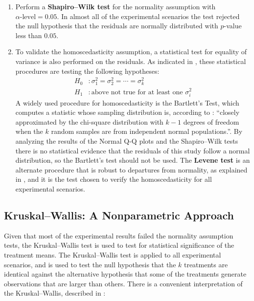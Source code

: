 \begin{enumerate}
    \item Perform a {\large\textbf{Shapiro–Wilk test}} for the normality assumption with $\alpha\text{-level} = 0.05$. In almost all of the experimental scenarios the test rejected the null hypothesis that the residuals are normally distributed with $p$-value less than $0.05$.

    \item To validate the homoscedasticity assumption, a statistical test for equality of variance is also performed on the residuals. As indicated in \cite{montgomery2017design}, these statistical procedures are testing the following hypotheses:
    \begin{align*}
        H_0 &: \sigma^2_1 =  \sigma^2_2 = \cdots =  \sigma^2_k \\
        H_1 &: \text{above not true for at least one } \sigma^2_i    
    \end{align*}
    A widely used procedure for homoscedasticity is the Bartlett's Test, which computes a statistic whose sampling distribution is, according to \cite{montgomery2017design}: ``closely approximated by the chi-square distribution with $k - 1$ degrees of freedom when the $k$ random samples are from independent normal populations.''. By analyzing the results of the Normal Q-Q plots and the Shapiro–Wilk tests there is no statistical evidence that the residuals of this study follow a normal distribution, so the Bartlett's test should not be used.
    The {\large\textbf{Levene test}} is an alternate procedure that is robust to departures from normality, as explained in \cite{brown1974robust}, and it is the test chosen to verify the homoscedasticity for all experimental scenarios.
    
\end{enumerate}

\subsection{Kruskal–Wallis: A Nonparametric Approach}

Given that most of the experimental results failed the normality assumption tests, the Kruskal–Wallis test is used to test for statistical significance of the treatment means. The Kruskal–Wallis test is applied to all experimental scenarios, and is used to test the null hypothesis that the $k$ treatments are identical against the alternative hypothesis that some of the treatments generate observations that are larger than others. There is a convenient interpretation of the Kruskal–Wallis, described in \cite{montgomery2017design}:

